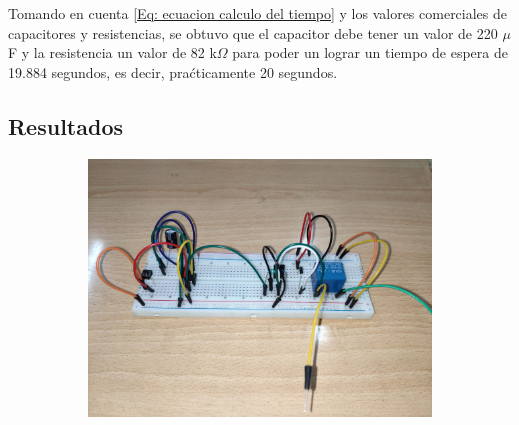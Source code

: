 Tomando en cuenta \eqref{Eq: ecuacion calculo del tiempo} y los valores comerciales de capacitores y resistencias, se obtuvo que el capacitor debe tener un valor de 220 $\mu$F y la resistencia un valor de 82 k$\Omega$ para poder un lograr un tiempo de espera de 19.884 segundos, es decir, praćticamente 20 segundos.

\subsection{Resultados}

\begin{figure}[htb]
    \centering
    \begin{subfigure}[htb]{0.45\textwidth}
        \centering
        \includegraphics[width=\textwidth]{media/circuito_real_1}
        \caption{}
    \end{subfigure}
    \centering
    \begin{subfigure}[htb]{0.45\textwidth}
        \centering

\end{subfigure}
\end{figure}
